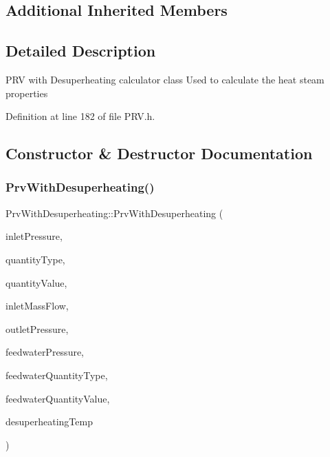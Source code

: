 \subsection*{Additional Inherited Members}


\subsection{Detailed Description}
P\+RV with Desuperheating calculator class Used to calculate the heat steam properties 

Definition at line 182 of file P\+R\+V.\+h.



\subsection{Constructor \& Destructor Documentation}
\mbox{\label{class_prv_with_desuperheating_adfd7f6866e8b953dcc41e51bb5b31b58}} 
\subsubsection{\texorpdfstring{Prv\+With\+Desuperheating()}{PrvWithDesuperheating()}\hspace{0.1cm}{\footnotesize\ttfamily [1/3]}}
{\footnotesize\ttfamily Prv\+With\+Desuperheating\+::\+Prv\+With\+Desuperheating (\begin{DoxyParamCaption}\item[{double}]{inlet\+Pressure,  }\item[{\hyperlink{class_steam_properties_ae0294bedf7d178c2d8fb6aed0f62fbff}{Steam\+Properties\+::\+Thermodynamic\+Quantity}}]{quantity\+Type,  }\item[{double}]{quantity\+Value,  }\item[{double}]{inlet\+Mass\+Flow,  }\item[{double}]{outlet\+Pressure,  }\item[{double}]{feedwater\+Pressure,  }\item[{\hyperlink{class_steam_properties_ae0294bedf7d178c2d8fb6aed0f62fbff}{Steam\+Properties\+::\+Thermodynamic\+Quantity}}]{feedwater\+Quantity\+Type,  }\item[{double}]{feedwater\+Quantity\+Value,  }\item[{double}]{desuperheating\+Temp }\end{DoxyParamCaption})}

